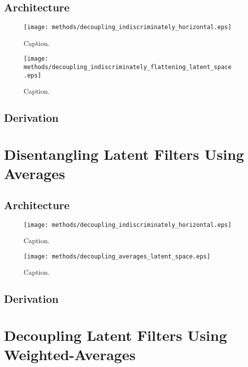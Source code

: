 \subsection{Architecture}
\begin{figure}[H]
\centering
\captionsetup{justification=centering}
\texttt{[image: methods/decoupling\_indiscriminately\_horizontal.eps]}
\caption{Caption.}
\label{fig:decoupling_indiscriminately_horizontal}
\end{figure}

\begin{figure}[H]
\centering
\captionsetup{justification=centering}
\texttt{[image: methods/decoupling\_indiscriminately\_flattening\_latent\_space.eps]}
\caption{Caption.}
\label{fig:decoupling_indiscriminately_flattening_latent_space}
\end{figure}

\subsection{Derivation}



%
%
%
%
%
\section{Disentangling Latent Filters Using Averages}
\lipsum[2]
\subsection{Architecture}
\begin{figure}[H]
\centering
\captionsetup{justification=centering}
\texttt{[image: methods/decoupling\_indiscriminately\_horizontal.eps]}
\caption{Caption.}
\label{fig:decoupling_indiscriminately_horizontal}
\end{figure}

\begin{figure}[H]
\centering
\captionsetup{justification=centering}
\texttt{[image: methods/decoupling\_averages\_latent\_space.eps]}
\caption{Caption.}
\label{fig:decoupling_averages_latent_space}
\end{figure}

\subsection{Derivation}

%
%
%
%
%
\section{Decoupling Latent Filters Using Weighted-Averages}
\lipsum[2]

